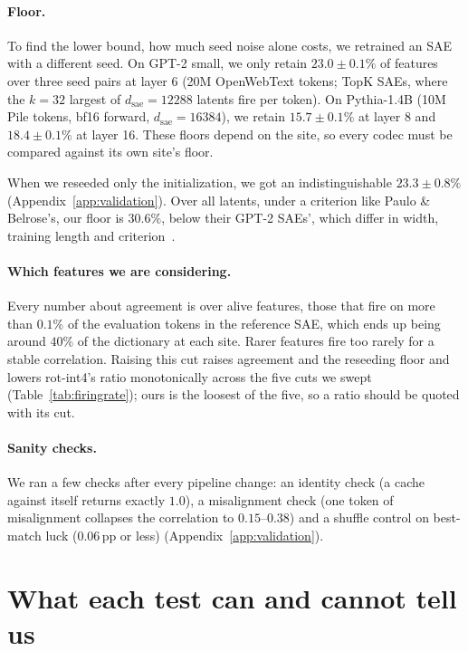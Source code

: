 \documentclass{article}
\begin{document}
\paragraph{Floor.} To find the lower bound, how much seed noise alone costs, we
retrained an SAE with a different seed. On GPT-2 small, we only retain
$23.0 \pm 0.1\%$ of features over three seed pairs at layer 6 (20M
OpenWebText tokens; TopK SAEs, where the $k{=}32$ largest of
$d_{\text{sae}}{=}12288$ latents fire per token). On Pythia-1.4B (10M
Pile tokens, bf16 forward, $d_{\text{sae}}{=}16384$), we retain
$15.7 \pm 0.1\%$ at layer 8 and $18.4 \pm 0.1\%$ at layer 16. These
floors depend on the site, so every codec must be compared against its
own site's floor.

When we reseeded only the initialization, we got an indistinguishable
$23.3 \pm 0.8\%$ (Appendix~\ref{app:validation}). Over all latents,
under a criterion like Paulo \& Belrose's, our floor is $30.6\%$, below
their GPT-2 SAEs', which differ in width, training length and
criterion~\citep{paulo}.

\paragraph{Which features we are considering.} Every number about
agreement is over alive features, those that fire on more than
$0.1\%$ of the evaluation tokens in the reference SAE, which ends up
being around $40\%$ of the dictionary at each site. Rarer features
fire too rarely for a stable correlation. Raising this cut raises agreement and the reseeding floor and lowers
rot-int4's ratio monotonically across the five cuts we swept
(Table~\ref{tab:firingrate}); ours is the loosest of the five, so a
ratio should be quoted with its cut.

\paragraph{Sanity checks.} We ran a few checks after every pipeline
change: an identity check (a cache against itself returns exactly
$1.0$), a misalignment check (one token of misalignment collapses the
correlation to $0.15$--$0.38$) and a shuffle control on best-match luck
($0.06$\,pp or less) (Appendix~\ref{app:validation}).

\section{What each test can and cannot tell us}
\label{sec:resolve}
\end{document}
